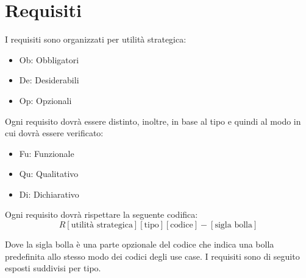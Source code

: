 \section{Requisiti}

I requisiti sono organizzati per utilità strategica:
\begin{itemize}
\item Ob: Obbligatori
\item De: Desiderabili
\item Op: Opzionali
\end{itemize}
Ogni requisito dovrà essere distinto, inoltre, in base al tipo e quindi al modo in cui dovrà essere verificato:
\begin{itemize}
\item Fu: Funzionale
\item Qu: Qualitativo
\item Di: Dichiarativo
\end{itemize}
Ogni requisito dovrà rispettare la seguente codifica:
$$
R[\text{utilità strategica}][\text{tipo}][\text{codice}]-[\text{sigla
    bolla}]
$$

Dove la sigla bolla è una parte opzionale del codice che indica una
bolla predefinita allo stesso modo dei codici degli use case.
I requisiti sono di seguito esposti suddivisi per tipo.




